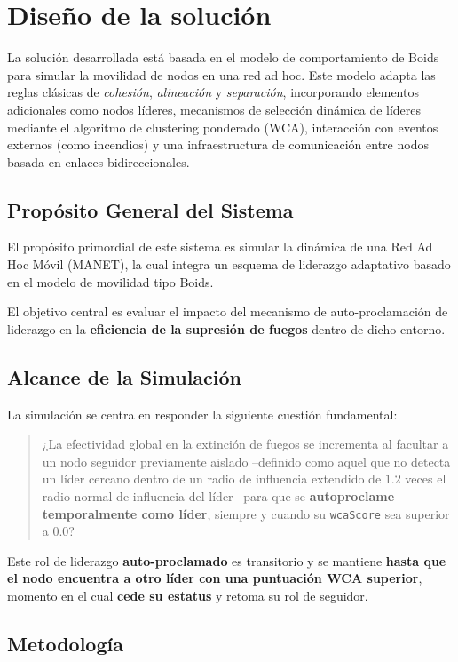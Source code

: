 \documentclass{article}
\begin{document}
\section{Diseño de la solución}

La solución desarrollada está basada en el modelo de comportamiento de Boids para simular la movilidad de nodos en una red ad hoc. Este modelo adapta las reglas clásicas de \textit{cohesión}, \textit{alineación} y \textit{separación}, incorporando elementos adicionales como nodos líderes, mecanismos de selección dinámica de líderes mediante el algoritmo de clustering ponderado (WCA), interacción con eventos externos (como incendios) y una infraestructura de comunicación entre nodos basada en enlaces bidireccionales.
\subsection*{Propósito General del Sistema}

El propósito primordial de este sistema es simular la dinámica de una Red Ad Hoc Móvil (MANET), la cual integra un esquema de liderazgo adaptativo basado en el modelo de movilidad tipo Boids.

El objetivo central es evaluar el impacto del mecanismo de auto-proclamación de liderazgo en la \textbf{eficiencia de la supresión de fuegos} dentro de dicho entorno.

\subsection*{Alcance de la Simulación}

La simulación se centra en responder la siguiente cuestión fundamental:

\begin{quote}
¿La efectividad global en la extinción de fuegos se incrementa al facultar a un nodo seguidor previamente aislado –definido como aquel que no detecta un líder cercano dentro de un radio de influencia extendido de $1.2$ veces el radio normal de influencia del líder– para que se \textbf{autoproclame temporalmente como líder}, siempre y cuando su \texttt{wcaScore} sea superior a 0.0?
\end{quote}

Este rol de liderazgo \textbf{auto-proclamado} es transitorio y se mantiene \textbf{hasta que el nodo encuentra a otro líder con una puntuación WCA superior}, momento en el cual \textbf{cede su estatus} y retoma su rol de seguidor.

\subsection{Metodología}
\end{document}
